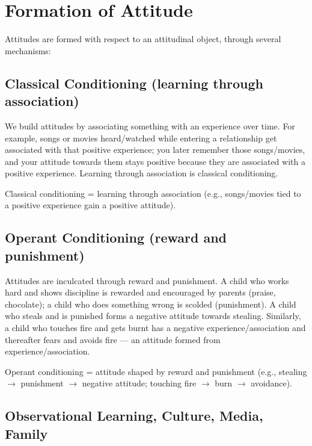 \section{Formation of Attitude}

Attitudes are formed with respect to an attitudinal object, through several mechanisms:

\subsection{Classical Conditioning (learning through association)}

We build attitudes by associating something with an experience over time. For example, songs or movies heard/watched while entering a relationship get associated with that positive experience; you later remember those songs/movies, and your attitude towards them stays positive because they are associated with a positive experience. Learning through association is classical conditioning.

\begin{KeyConcept}
Classical conditioning = learning through association (e.g., songs/movies tied to a positive experience gain a positive attitude).
\end{KeyConcept}

\subsection{Operant Conditioning (reward and punishment)}

Attitudes are inculcated through reward and punishment. A child who works hard and shows discipline is rewarded and encouraged by parents (praise, chocolate); a child who does something wrong is scolded (punishment). A child who steals and is punished forms a negative attitude towards stealing. Similarly, a child who touches fire and gets burnt has a negative experience/association and thereafter fears and avoids fire --- an attitude formed from experience/association.

\begin{KeyConcept}
Operant conditioning = attitude shaped by reward and punishment (e.g., stealing $\rightarrow$ punishment $\rightarrow$ negative attitude; touching fire $\rightarrow$ burn $\rightarrow$ avoidance).
\end{KeyConcept}

\subsection{Observational Learning, Culture, Media, Family}

